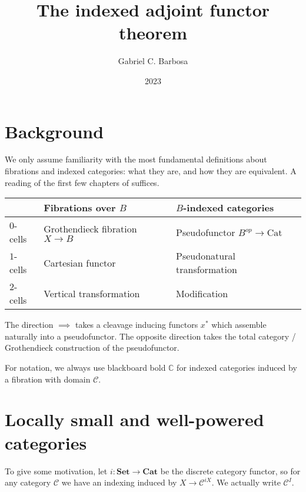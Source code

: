 \documentclass[10pt, oneside]{article}
\title{The indexed adjoint functor theorem}
\author{Gabriel C. Barbosa}
\date{2023}
\begin{document}
\maketitle

\tableofcontents

\vspace{.25in}

\section{Background}

We only assume familiarity with the most fundamental definitions about fibrations and indexed categories: what they are, and how they are equivalent. A reading of the first few chapters of \cite{Streicher2018} suffices.

\vspace{0.5cm}

\def\arraystretch{1.5}
\begin{tabular}{ | m{5em} | m{5cm}| m{5cm} | } 
  \hline
  & Fibrations over $B$ & $B$-indexed categories \\ 
  \hline
  $0$-cells & Grothendieck fibration $X \to B$ & Pseudofunctor $B^{op} \to \mathrm{Cat}$ \\ 
  \hline
  $1$-cells & Cartesian functor & Pseudonatural transformation \\
  \hline
  $2$-cells & Vertical transformation & Modification \\
  \hline
\end{tabular}
\vspace{0.5cm}

The direction $\implies$ takes a cleavage inducing functors $x^\ast$ which assemble naturally into a pseudofunctor. The opposite direction takes the total category / Grothendieck construction of the pseudofunctor.

For notation, we always use blackboard bold $\mathbb{C}$ for indexed categories induced by a fibration with domain $\mathcal{C}$.


\section{Locally small and well-powered categories}

To give some motivation, let $i: \mathbf{Set} \to \mathbf{Cat}$ be the discrete category functor, so for any category $\mathcal{C}$ we have an indexing induced by $X \to \mathcal{C}^{iX}$. We actually write $\mathcal{C}^I$.
\end{document}
